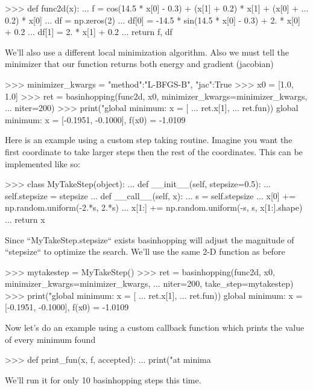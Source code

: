 \begin{DoxyVerb}
>>> def func2d(x):
...     f = cos(14.5 * x[0] - 0.3) + (x[1] + 0.2) * x[1] + (x[0] +
...                                                         0.2) * x[0]
...     df = np.zeros(2)
...     df[0] = -14.5 * sin(14.5 * x[0] - 0.3) + 2. * x[0] + 0.2
...     df[1] = 2. * x[1] + 0.2
...     return f, df

We'll also use a different local minimization algorithm.  Also we must tell
the minimizer that our function returns both energy and gradient (jacobian)

>>> minimizer_kwargs = {"method":"L-BFGS-B", "jac":True}
>>> x0 = [1.0, 1.0]
>>> ret = basinhopping(func2d, x0, minimizer_kwargs=minimizer_kwargs,
...                    niter=200)
>>> print("global minimum: x = [%
...                                                           ret.x[1],
...                                                           ret.fun))
global minimum: x = [-0.1951, -0.1000], f(x0) = -1.0109


Here is an example using a custom step taking routine.  Imagine you want
the first coordinate to take larger steps then the rest of the coordinates.
This can be implemented like so:

>>> class MyTakeStep(object):
...    def __init__(self, stepsize=0.5):
...        self.stepsize = stepsize
...    def __call__(self, x):
...        s = self.stepsize
...        x[0] += np.random.uniform(-2.*s, 2.*s)
...        x[1:] += np.random.uniform(-s, s, x[1:].shape)
...        return x

Since ``MyTakeStep.stepsize`` exists basinhopping will adjust the magnitude
of ``stepsize`` to optimize the search.  We'll use the same 2-D function as
before

>>> mytakestep = MyTakeStep()
>>> ret = basinhopping(func2d, x0, minimizer_kwargs=minimizer_kwargs,
...                    niter=200, take_step=mytakestep)
>>> print("global minimum: x = [%
...                                                           ret.x[1],
...                                                           ret.fun))
global minimum: x = [-0.1951, -0.1000], f(x0) = -1.0109


Now let's do an example using a custom callback function which prints the
value of every minimum found

>>> def print_fun(x, f, accepted):
...         print("at minima %

We'll run it for only 10 basinhopping steps this time.


\end{DoxyVerb}
